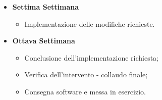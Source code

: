 {\begin{itemize}
\begin{itemize}
            \item Analisi dei requisiti richiesti dal cliente e degli impatti sull'applicazione di studio;
            \item Implementazione delle modifiche richieste.
        \end{itemize}
        \item \textbf{Settima Settimana}
        \begin{itemize}
            \item Implementazione delle modifiche richieste.
        \end{itemize}
        \item \textbf{Ottava Settimana}
        \begin{itemize}
            \item Conclusione dell'implementazione richiesta;
            \item Verifica dell'intervento - collaudo finale;
            \item Consegna software e messa in esercizio.
        \end{itemize}
    \end{itemize}
}

\newcommand{\totaleOre}{300}

\newcommand{\obiettiviObbligatori}{
	 \item \underline{\textit{O01}}: Acquisizione competenze sulle tematiche sopra descritte;
	 \item \underline{\textit{O02}}: Capacità di raggiungere gli obiettivi richiesti in autonomia seguendo il cronoprogramma;
	 \item \underline{\textit{O03}}: Portare a termine le modifiche richieste dal cliente con una percentuale di superamento pari al 50\%.
}

\newcommand{\obiettiviDesiderabili}{
    \item \underline{\textit{D01}}: Portare a termine le modifiche richieste dal cliente con una percentuale di superamento pari all'80\%.
}

\newcommand{\obiettiviFacoltativi}{
	 \item \underline{\textit{F01}}: Acquisizione competenze sul framework Spring Cloud.
}

